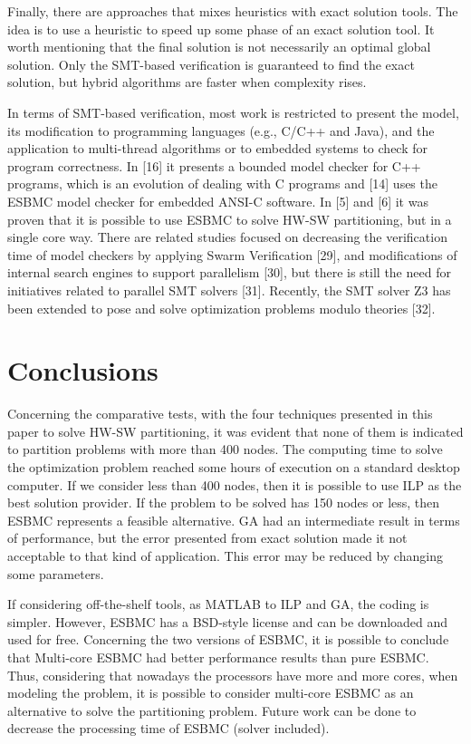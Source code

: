 Finally, there are approaches that mixes heuristics with exact solution tools. The idea is to use a heuristic to speed up some phase of an exact solution tool. It worth mentioning that the final solution is not necessarily an optimal global solution. Only the SMT-based verification is guaranteed to find the exact solution, but hybrid algorithms are faster when complexity rises.

In terms of SMT-based verification, most work is restricted to present the model, its modification to programming languages (e.g., C/C++ and Java), and the application to multi-thread algorithms or to embedded systems to check for program correctness. In [16] it presents a bounded model checker for C++ programs, which is an evolution of dealing with C programs and [14] uses the ESBMC model checker for embedded ANSI-C software. In [5] and [6] it was proven that it is possible to use ESBMC to solve HW-SW partitioning, but in a single core way. There are related studies focused on decreasing the verification time of model checkers by applying Swarm Verification [29], and modifications of internal search engines to support parallelism [30], but there is still the need for initiatives related to parallel SMT solvers [31]. Recently, the SMT solver Z3 has been extended to pose and solve optimization problems modulo theories [32].

\section{Conclusions}

Concerning the comparative tests, with the four techniques presented in this paper to solve HW-SW partitioning, it was evident that none of them is indicated to partition problems with more than 400 nodes. The computing time to solve the optimization problem reached some hours of execution on a standard desktop computer. If we consider less than 400 nodes, then it is possible to use ILP as the best solution provider. If the problem to be solved has 150 nodes or less, then ESBMC represents a feasible alternative. GA had an intermediate result in terms of performance, but the error presented from exact solution made it not acceptable to that kind of application. This error may be reduced by changing some parameters.

If considering off-the-shelf tools, as MATLAB to ILP and GA, the coding is simpler. However, ESBMC has a BSD-style license and can be downloaded and used for free. Concerning the two versions of ESBMC, it is possible to conclude that Multi-core ESBMC had better performance results than pure ESBMC. Thus, considering that nowadays the processors have more and more cores, when modeling the problem, it is possible to consider multi-core ESBMC as an alternative to solve the partitioning problem. Future work can be done to decrease the processing time of ESBMC (solver included).

